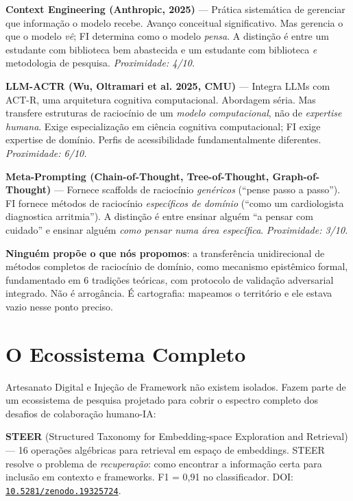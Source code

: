 \documentclass[12pt,a4paper]{article}
\begin{document}
\textbf{Context Engineering (Anthropic, 2025)} --- Prática sistemática de gerenciar que informação o modelo recebe. Avanço conceitual significativo. Mas gerencia o que o modelo \emph{vê}; FI determina como o modelo \emph{pensa}. A distinção é entre um estudante com biblioteca bem abastecida e um estudante com biblioteca \emph{e} metodologia de pesquisa. \emph{Proximidade: 4/10.}

\textbf{LLM-ACTR (Wu, Oltramari et al. 2025, CMU)} --- Integra LLMs com ACT-R, uma arquitetura cognitiva computacional. Abordagem séria. Mas transfere estruturas de raciocínio de um \emph{modelo computacional}, não de \emph{expertise humana}. Exige especialização em ciência cognitiva computacional; FI exige expertise de domínio. Perfis de acessibilidade fundamentalmente diferentes. \emph{Proximidade: 6/10.}

\textbf{Meta-Prompting (Chain-of-Thought, Tree-of-Thought, Graph-of-Thought)} --- Fornece scaffolds de raciocínio \emph{genéricos} (``pense passo a passo''). FI fornece métodos de raciocínio \emph{específicos de domínio} (``como um cardiologista diagnostica arritmia''). A distinção é entre ensinar alguém ``a pensar com cuidado'' e ensinar alguém \emph{como pensar numa área específica}. \emph{Proximidade: 3/10.}

\textbf{Ninguém propõe o que nós propomos}: a transferência unidirecional de métodos completos de raciocínio de domínio, como mecanismo epistêmico formal, fundamentado em 6 tradições teóricas, com protocolo de validação adversarial integrado. Não é arrogância. É cartografia: mapeamos o território e ele estava vazio nesse ponto preciso.

\section{O Ecossistema Completo}
\label{sec:ecossistema}

Artesanato Digital e Injeção de Framework não existem isolados. Fazem parte de um ecossistema de pesquisa projetado para cobrir o espectro completo dos desafios de colaboração humano-IA:

\textbf{STEER} (Structured Taxonomy for Embedding-space Exploration and Retrieval) --- 16 operações algébricas para retrieval em espaço de embeddings. STEER resolve o problema de \emph{recuperação}: como encontrar a informação certa para inclusão em contexto e frameworks. F1 = 0,91 no classificador. DOI: \href{https://doi.org/10.5281/zenodo.19325724}{\texttt{10.5281/zenodo.19325724}}.
\end{document}
